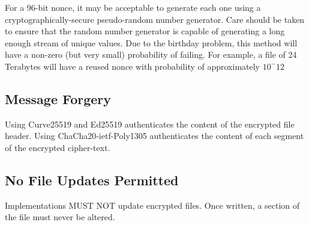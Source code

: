 \documentclass[10pt]{article}
\begin{document}
For a 96-bit nonce, it may be acceptable to generate each one using a cryptographically-secure pseudo-random number
generator.
Care should be taken to ensure that the random number generator is capable of generating a long enough stream
of unique values.
Due to the birthday problem, this method will have a non-zero (but very small) probability of failing.
For example, a file of 24 Terabytes will have a reused nonce with probability of approximately $10^-12$

\subsection{Message Forgery}
Using Curve25519 and Ed25519 authenticates the content of the encrypted file header.
Using ChaCha20-ietf-Poly1305 authenticates the content of each segment of the encrypted cipher-text.

\subsection{No File Updates Permitted}
Implementations MUST NOT update encrypted files.
Once written, a section of the file must never be altered.


\end{document}
